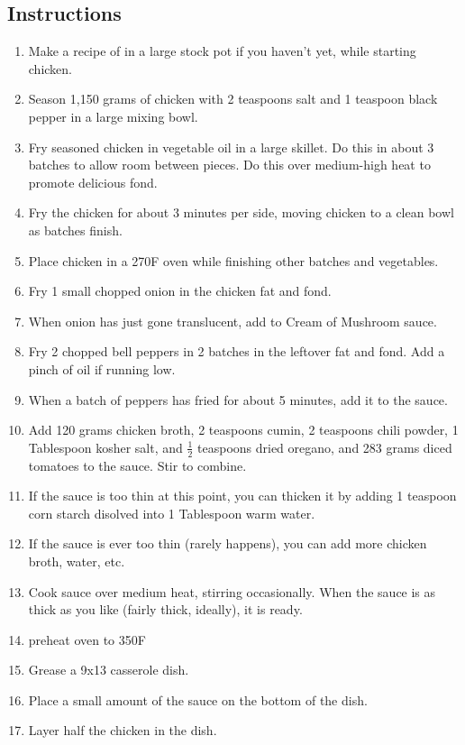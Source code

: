 \begin{multicols}{2}
\subsection*{Instructions}
\begin{enumerate}
    \item Make a recipe of  in a large stock pot if you haven't yet, while starting chicken.
    \item Season 1,150 grams of chicken with 2 teaspoons salt and 1 teaspoon black pepper in a large mixing bowl.
    \item Fry seasoned chicken in vegetable oil in a large skillet. Do this in about 3 batches to allow room between pieces. Do this over medium-high heat to promote delicious fond.
    \item Fry the chicken for about 3 minutes per side, moving chicken to a clean bowl as batches finish.
    \item Place chicken in a 270F oven while finishing other batches and vegetables.
    \item Fry 1 small chopped onion in the chicken fat and fond.
    \item When onion has just gone translucent, add to Cream of Mushroom sauce.
    \item Fry 2 chopped bell peppers in 2 batches in the leftover fat and fond. Add a pinch of oil if running low.
    \item When a batch of peppers has fried for about 5 minutes, add it to the sauce.
    \item Add 120 grams chicken broth, 2 teaspoons cumin, 2 teaspoons chili powder, 1 Tablespoon kosher salt, and \( \frac{1}{2} \) teaspoons dried oregano, and 283 grams diced tomatoes to the sauce. Stir to combine.
    \item If the sauce is too thin at this point, you can thicken it by adding 1 teaspoon corn starch disolved into 1 Tablespoon warm water.
    \item If the sauce is ever too thin (rarely happens), you can add more chicken broth, water, etc.
    \item Cook sauce over medium heat, stirring occasionally. When the sauce is as thick as you like (fairly thick, ideally), it is ready.
    \item preheat oven to 350F
    \item Grease a 9x13 casserole dish.
    \item Place a small amount of the sauce on the bottom of the dish.
    \item Layer half the chicken in the dish.

\end{enumerate}
\end{multicols}

